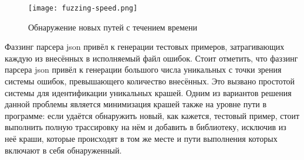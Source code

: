 \begin{figure}[h]
	\centering
	\texttt{[image: fuzzing-speed.png]}
	\caption{Обнаружение новых путей с течением времени}
	\label{fig:fuzzing-speed}
\end{figure}%

Фаззинг парсера json привёл к генерации тестовых примеров, затрагивающих каждую из внесённых в исполняемый файл ошибок. Стоит отметить, что фаззинг парсера json привёл к генерации большого числа уникальных с точки зрения системы ошибок, превышающего количество внесённых. Это вызвано простотой системы для идентификации уникальных крашей. Одним из вариантов решения данной проблемы является минимизация крашей также на уровне пути в программе: если удаётся обнаружить новый, как кажется, тестовый пример, стоит выполнить полную трассировку на нём и добавить в библиотеку, исключив из неё краши, которые происходят в том же месте и пути выполнения которых включают в себя обнаруженный.
